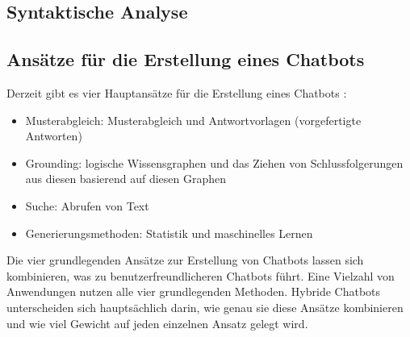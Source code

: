 \subsection{Syntaktische Analyse}
\subsection{Ansätze für die Erstellung eines Chatbots}\label{sec:ansaetze_erstellung_chatbots}
Derzeit gibt es vier Hauptansätze für die Erstellung eines Chatbots \cite{lane_natural_2019}:
\begin{itemize}
    \item Musterabgleich: Musterabgleich und Antwortvorlagen (vorgefertigte Antworten)
    \item Grounding: logische Wissensgraphen und das Ziehen von Schlussfolgerungen aus diesen basierend auf diesen Graphen
    \item Suche: Abrufen von Text
    \item Generierungsmethoden: Statistik und maschinelles Lernen
\end{itemize}
Die vier grundlegenden Ansätze zur Erstellung von Chatbots lassen sich kombinieren, was zu benutzerfreundlicheren Chatbots führt. 
Eine Vielzahl von Anwendungen nutzen alle vier grundlegenden Methoden. 
Hybride Chatbots unterscheiden sich hauptsächlich darin, wie genau sie diese Ansätze kombinieren und wie viel Gewicht auf jeden einzelnen Ansatz gelegt wird.
